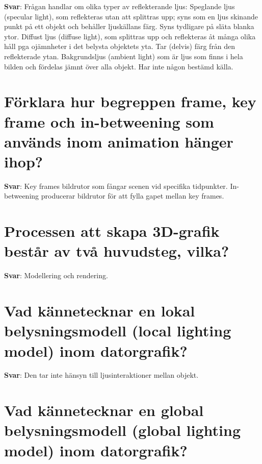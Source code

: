 \documentclass[a4paper,11pt,oneside]{book}
\begin{document}
\begin{sloppypar}
\textbf{Svar}: Fr\r{a}gan handlar om olika typer av reflekterande ljus: Speglande ljus (specular light), som reflekteras utan att splittras upp; syns som en ljus skinande punkt p\r{a} ett objekt och beh\r{a}ller ljusk\"allans f\"arg. Syns tydligare p\r{a} sl\"ata blanka ytor. Diffust ljus (diffuse light), som splittras upp och reflekteras \r{a}t m\r{a}nga olika h\r{a}ll pga oj\"amnheter i det belysta objektets yta. Tar (delvis) f\"arg fr\r{a}n den reflekterade ytan. Bakgrundsljus (ambient light) som \"ar ljus som finns i hela bilden och f\"ordelas j\"amnt \"over alla objekt. Har inte n\r{a}gon best\"amd k\"alla.



\section{F\"orklara hur begreppen frame, key frame och in-betweening som anv\"ands inom animation h\"anger ihop?}

\label{q:307:sa:sv:True}

\textbf{Svar}: Key frames {\textendash} bildrutor som f\r{a}ngar scenen vid specifika tidpunkter. In-betweening {\textendash} producerar bildrutor f\"or att fylla gapet mellan key frames.



\section{Processen att skapa 3D-grafik best\r{a}r av tv\r{a} huvudsteg, vilka?}

\label{q:308:sa:sv:True}

\textbf{Svar}: Modellering och rendering.



\section{Vad k\"annetecknar en lokal belysningsmodell (local lighting model) inom datorgrafik?}

\label{q:309:sa:sv:True}

\textbf{Svar}: Den tar inte h\"ansyn till ljusinteraktioner mellan objekt.



\section{Vad k\"annetecknar en global belysningsmodell (global lighting model) inom datorgrafik?}


\end{sloppypar}
\end{document}
